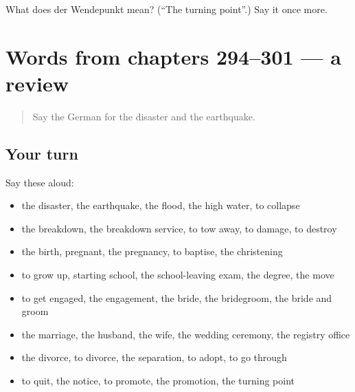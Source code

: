 \begin{tcolorbox}[breakable,colback=teal!4,colframe=teal!35!black,title={Before you move on}]
What does der Wendepunkt mean? (\textquotedblleft{}The turning point\textquotedblright{}.) Say it once more.
\end{tcolorbox}
\section[(dialogue)]{Words from chapters 294–301 — a review}

\label{lesson:GE-R301-review-294-301}



\begin{quote}
Say the German for the disaster and the earthquake.
\end{quote}

\subsection*{Your turn}
Say these aloud:

\begin{itemize}
\raggedright
  \item the disaster, the earthquake, the flood, the high water, to collapse
  \item the breakdown, the breakdown service, to tow away, to damage, to destroy
  \item the birth, pregnant, the pregnancy, to baptise, the christening
  \item to grow up, starting school, the school-leaving exam, the degree, the move
  \item to get engaged, the engagement, the bride, the bridegroom, the bride and groom
  \item the marriage, the husband, the wife, the wedding ceremony, the registry office
  \item the divorce, to divorce, the separation, to adopt, to go through
  \item to quit, the notice, to promote, the promotion, the turning point
\end{itemize}

